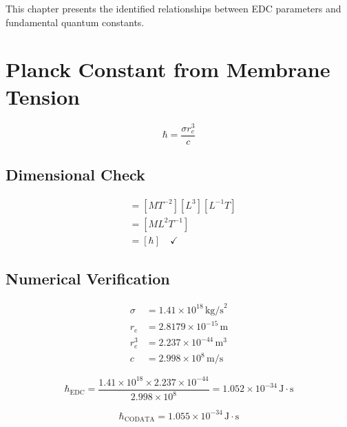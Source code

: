 \documentclass[12pt,a4paper,openany]{book}
\theoremstyle{definition}
\theoremstyle{plain}
\theoremstyle{remark}
\newcommand{\re}{r_e}                      %
\begin{document}
This chapter presents the identified relationships between EDC parameters and fundamental quantum constants.

\section{Planck Constant from Membrane Tension}

\begin{identifiedbox}
\begin{equation}
\boxed{\hbar = \frac{\sigma \re^3}{c}}
\label{eq:hbar_edc}
\end{equation}
\end{identifiedbox}

\subsection{Dimensional Check}

\begin{dimcheckbox}
\begin{align}
[\sigma \re^3 / c] &= [M T^{-2}][L^3][L^{-1}T] \\
&= [M L^2 T^{-1}] \\
&= [\hbar] \quad \checkmark
\end{align}
\end{dimcheckbox}

\subsection{Numerical Verification}

\begin{align}
\sigma &= 1.41 \times 10^{18}\,\text{kg/s}^2 \\
\re &= 2.8179 \times 10^{-15}\,\text{m} \\
\re^3 &= 2.237 \times 10^{-44}\,\text{m}^3 \\
c &= 2.998 \times 10^8\,\text{m/s}
\end{align}

\begin{equation}
\hbar_{\text{EDC}} = \frac{1.41 \times 10^{18} \times 2.237 \times 10^{-44}}{2.998 \times 10^8} = 1.052 \times 10^{-34}\,\text{J}\cdot\text{s}
\end{equation}

\begin{equation}
\hbar_{\text{CODATA}} = 1.055 \times 10^{-34}\,\text{J}\cdot\text{s}
\end{equation}
\end{document}
